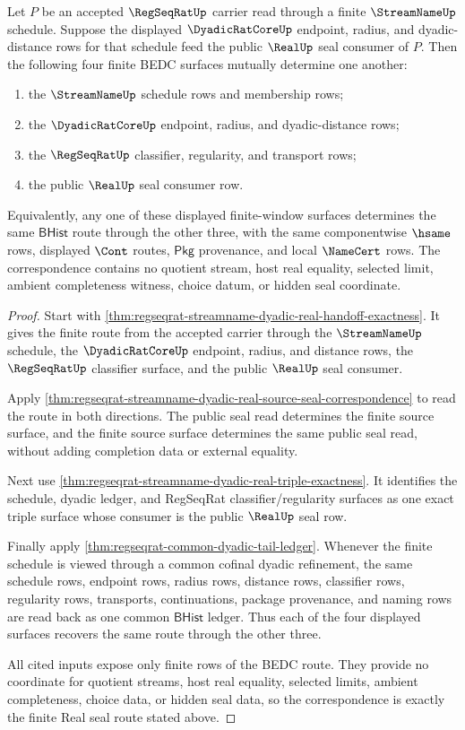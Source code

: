 \begin{theorem}
\label{thm:regseqrat-real-seal-window-triple-correspondence}
Let $P$ be an accepted $\RegSeqRatUp$ carrier read through a finite
$\StreamNameUp$ schedule. Suppose the displayed $\DyadicRatCoreUp$ endpoint,
radius, and dyadic-distance rows for that schedule feed the public $\RealUp$
seal consumer of $P$. Then the following four finite BEDC surfaces mutually
determine one another:
\begin{enumerate}
\item the $\StreamNameUp$ schedule rows and membership rows;
\item the $\DyadicRatCoreUp$ endpoint, radius, and dyadic-distance rows;
\item the $\RegSeqRatUp$ classifier, regularity, and transport rows;
\item the public $\RealUp$ seal consumer row.
\end{enumerate}
Equivalently, any one of these displayed finite-window surfaces determines the
same $\mathsf{BHist}$ route through the other three, with the same
componentwise $\hsame$ rows, displayed $\Cont$ routes, $\mathsf{Pkg}$
provenance, and local $\NameCert$ rows. The correspondence contains no
quotient stream, host real equality, selected limit, ambient completeness
witness, choice datum, or hidden seal coordinate.
\end{theorem}
\begin{proof}
Start with
\autoref{thm:regseqrat-streamname-dyadic-real-handoff-exactness}. It gives the
finite route from the accepted carrier through the $\StreamNameUp$ schedule,
the $\DyadicRatCoreUp$ endpoint, radius, and distance rows, the
$\RegSeqRatUp$ classifier surface, and the public $\RealUp$ seal consumer.

Apply
\autoref{thm:regseqrat-streamname-dyadic-real-source-seal-correspondence} to
read the route in both directions. The public seal read determines the
finite source surface, and the finite source surface determines the same
public seal read, without adding completion data or external equality.

Next use \autoref{thm:regseqrat-streamname-dyadic-real-triple-exactness}. It
identifies the schedule, dyadic ledger, and RegSeqRat classifier/regularity
surfaces as one exact triple surface whose consumer is the public $\RealUp$
seal row.

Finally apply \autoref{thm:regseqrat-common-dyadic-tail-ledger}. Whenever the
finite schedule is viewed through a common cofinal dyadic refinement, the same
schedule rows, endpoint rows, radius rows, distance rows, classifier rows,
regularity rows, transports, continuations, package provenance, and naming
rows are read back as one common $\mathsf{BHist}$ ledger. Thus each of the
four displayed surfaces recovers the same route through the other three.

All cited inputs expose only finite rows of the BEDC route. They provide no
coordinate for quotient streams, host real equality, selected limits, ambient
completeness, choice data, or hidden seal data, so the correspondence is
exactly the finite Real seal route stated above.
\end{proof}

